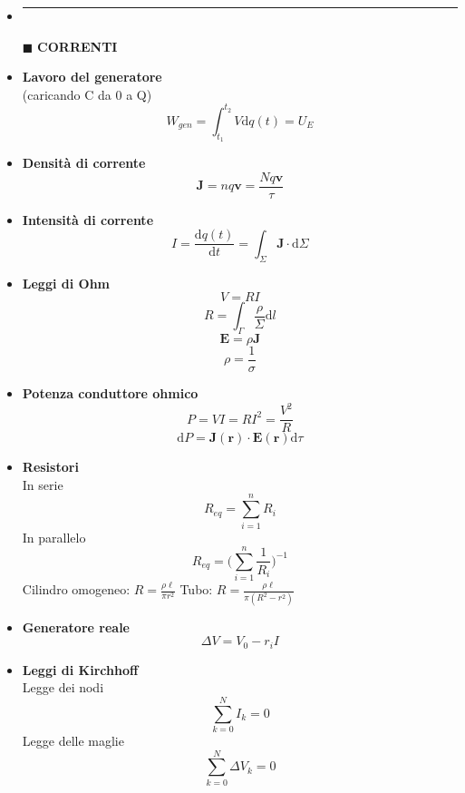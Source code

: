 \documentclass{book}
\newcommand{\g}{\textbf}
\newcommand{\h}{\mathbf}
\newcommand{\e}{\begin{equation}}
\newcommand{\ex}{\end{equation} }
\renewcommand{\it}{\item[$\cdot$]}
\newcommand{\sep}{\item[]\rule{\linewidth}{0.4pt}}
\begin{document}
\begin{multicols}{4}
\begin{itemize}
\newpage
\sep
\item [$\blacksquare$] \g{CORRENTI}
    \it \g{Lavoro del generatore} \\
        (caricando C da 0 a Q)
        \e{W_{gen}=\int_{t_1}^{t_2} V \mathrm{d}q(t)=U_E} \ex
    \it \g{Densità di corrente}
        \e{\h{J}=nq\h{v}=\frac{Nq\h{v}}{\tau}} \ex
    \it \g{Intensità di corrente}
        \e{I=\frac{\mathrm{d} q(t)}{\mathrm{d} t}=\int_\Sigma \h{J}\cdot \mathrm{d}\Sigma} \ex
    \it \g{Leggi di Ohm}
        \e{V=RI} \ex
        \e{R=\int_\Gamma\frac{\rho}{\Sigma}\mathrm{d}l} \ex
        \e{\h{E}=\rho\h{J}} \ex
        \e{\rho=\frac{1}{\sigma}} \ex
    \it \g{Potenza conduttore ohmico}
        \e{P=VI=RI^2=\frac{V^2}{R}} \ex
        \e{\mathrm{d}P=\h{J}(\h{r})\cdot\h{E}(\h{r})\mathrm{d}\tau} \ex
    \it \g{Resistori} \\
    In serie
        \e{R_{eq}= \sum_{i=1}^n R_i} \ex
    In parallelo
        \e{R_{eq}=\biggl( \sum_{i=1}^n \frac{1}{R_i} \biggr)^{-1}} \ex
    Cilindro omogeneo: $R=\frac{\rho \ell}{\pi r^2}$ \quad Tubo: $R=\frac{\rho \ell}{\pi(R^2-r^2)}$
    \it \g{Generatore reale} \\
        \e{\Delta V=V_0-r_i I}\ex
    \it \g{Leggi di Kirchhoff}\\
    Legge dei nodi
        \e{\sum_{k=0}^NI_k=0}\ex
    Legge delle maglie
        \e{\sum_{k=0}^N\Delta V_k=0}\ex


\end{itemize}
\end{multicols}
\end{document}
